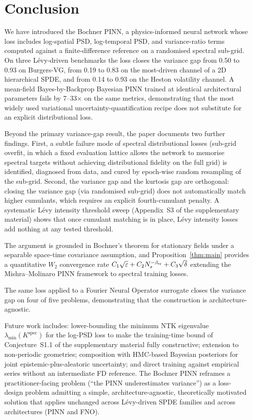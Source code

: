 \documentclass[10pt]{elsarticle}
\begin{document}
\section{Conclusion}
\label{sec:conclusion}

We have introduced the Bochner PINN, a physics-informed neural
network whose loss includes log-spatial PSD, log-temporal PSD,
and variance-ratio terms computed against a finite-difference
reference on a randomised spectral sub-grid. On three L\'evy-driven
benchmarks the loss closes the variance gap from 0.50 to 0.93 on
Burgers-VG, from 0.19 to 0.83 on the most-driven channel of a
2D hierarchical SPDE, and from 0.14 to 0.93 on the Heston
volatility channel. A mean-field Bayes-by-Backprop Bayesian PINN
trained at identical architectural parameters fails by
7--33\(\times\) on the same metrics, demonstrating that the most
widely used variational uncertainty-quantification recipe does
not substitute for an explicit distributional loss.

Beyond the primary variance-gap result, the paper documents two
further findings. First, a subtle failure mode of spectral
distributional losses (sub-grid overfit, in which a fixed
evaluation lattice allows the network to memorise spectral targets
without achieving distributional fidelity on the full grid)
is identified, diagnosed from data, and cured by epoch-wise random
resampling of the sub-grid. Second, the variance gap and the
kurtosis gap are orthogonal: closing the variance gap (via
randomised sub-grid) does not automatically match higher cumulants,
which requires an explicit fourth-cumulant penalty. A systematic
L\'evy intensity threshold sweep (Appendix~S3 of the supplementary material)
shows that once cumulant matching is in place, L\'evy intensity
losses add nothing at any tested threshold.

The argument is grounded in Bochner's theorem for stationary
fields under a separable space-time covariance assumption, and
Proposition~\ref{thm:main} provides a quantitative
\(W_2\) convergence rate
\(C_1\sqrt\varepsilon + C_2 N_s^{-\beta_{\rm sr}} + C_3\sqrt\delta\)
extending the Mishra--Molinaro PINN framework to spectral training
losses.

The same loss applied to a Fourier Neural Operator surrogate closes the variance gap on four of five problems, demonstrating that the construction is architecture-agnostic.

Future work includes: lower-bounding the minimum NTK eigenvalue
$\lambda_{\min}(K^{\mathrm{spec}})$ for the log-PSD loss to make the
training-time bound of Conjecture~S1.1 of the supplementary material fully constructive;
extension to non-periodic geometries; composition with HMC-based
Bayesian posteriors for joint epistemic-plus-aleatoric uncertainty;
and direct training against empirical series without an intermediate FD
reference. The Bochner PINN reframes a practitioner-facing problem
(``the PINN underestimates variance'') as a loss-design problem
admitting a simple, architecture-agnostic, theoretically motivated
solution that applies unchanged across L\'evy-driven SPDE families and across architectures (PINN and FNO).
\end{document}
